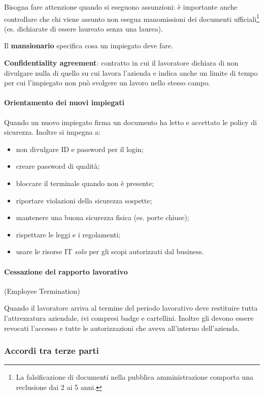Bisogna fare attenzione quando si eseguono assunzioni: è
importante anche controllare che chi viene assunto non esegua manomissioni dei
documenti ufficiali\footnote{La falsificazione di documenti nella pubblica
amministrazione comporta una reclusione dai 2 ai 5 anni.} (es. dichiarate di
essere laureato senza una laurea).

Il \textbf{mansionario} specifica cosa un impiegato deve fare.

\textbf{Confidentiality agreement}: contratto in cui il lavoratore dichiara di
non divulgare nulla di quello su cui lavora l'azienda e indica anche un limite
di tempo per cui l'impiegato non può svolgere un lavoro nello stesso campo.


\paragraph{Orientamento dei nuovi impiegati}

Quando un nuovo impiegato firma un documento ha letto e accettato le policy di
sicurezza. Inoltre si impegna a:
\begin{itemize}
\item non divulgare ID e password per il login;
\item creare password di qualità;
\item bloccare il terminale quando non è presente;
\item riportare violazioni della sicurezza sospette;
\item mantenere una buona sicurezza fisica (es. porte chiuse);
\item rispettare le leggi e i regolamenti;
\item usare le risorse IT \emph{solo} per gli scopi autorizzati dal
business.
\end{itemize}

\paragraph{Cessazione del rapporto lavorativo} (Employee Termination)

Quando il lavoratore arriva al termine del periodo lavorativo deve
restituire tutta l'attrezzatura aziendale, ivi compresi badge e cartellini.
Inoltre gli devono essere revocati l'accesso e tutte le autorizzazioni
che aveva all'interno dell'azienda.


\subsubsection{Accordi tra terze parti}

